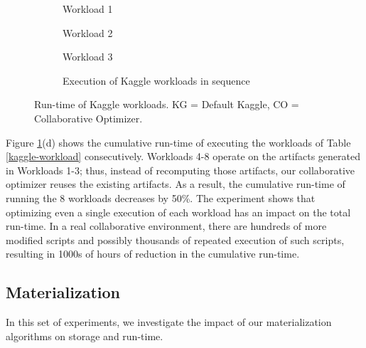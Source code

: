 \begin{figure}[h]
\begin{subfigure}[b]{0.33\linewidth}
\centering
 \resizebox{\columnwidth}{!}{%
%
}
\caption{Workload 1}
\end{subfigure}%
\begin{subfigure}[b]{0.33\linewidth}
\centering
 \resizebox{\columnwidth}{!}{%
%
}
\caption{Workload 2}
\end{subfigure}%
\begin{subfigure}[b]{0.33\linewidth}
\centering
 \resizebox{\columnwidth}{!}{%
%
}
\caption{Workload 3}
\end{subfigure}
\begin{subfigure}[b]{\linewidth}
\centering
 \resizebox{\columnwidth}{!}{%
%
}
\caption{Execution of Kaggle workloads in sequence}
\end{subfigure}
\caption{Run-time of Kaggle workloads. KG = Default Kaggle, CO = Collaborative Optimizer.}
\label{exp-reuse-kaggle-same-workload}
\end{figure}

Figure \ref{exp-reuse-kaggle-same-workload}(d) shows the cumulative run-time of executing the workloads of Table \ref{kaggle-workload} consecutively.
Workloads 4-8 operate on the artifacts generated in Workloads 1-3; thus, instead of recomputing those artifacts, our collaborative optimizer reuses the existing artifacts.
As a result, the cumulative run-time of running the 8 workloads decreases by 50\%.
The experiment shows that optimizing even a single execution of each workload has an impact on the total run-time.
In a real collaborative environment, there are hundreds of more modified scripts and possibly thousands of repeated execution of such scripts, resulting in 1000s of hours of reduction in the cumulative run-time.
\subsection{Materialization}
In this set of experiments, we investigate the impact of our materialization algorithms on storage and run-time.

